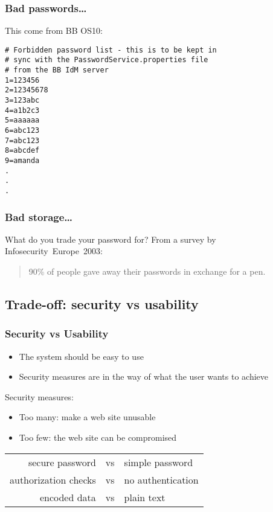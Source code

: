\begin{frame}[fragile]
\frametitle{Bad passwords\ldots}

This come from BB OS10:
\begin{lstlisting}
# Forbidden password list - this is to be kept in 
# sync with the PasswordService.properties file 
# from the BB IdM server
1=123456
2=12345678
3=123abc
4=a1b2c3
5=aaaaaa
6=abc123
7=abc123
8=abcdef
9=amanda
.
.
.
\end{lstlisting}
\end{frame}

\begin{frame}
\frametitle{Bad storage\ldots}

\end{frame}

\begin{frame}
\begin{exampleblock}{What do you trade your password for?}
From a survey by Infosecurity~Europe~2003:
\begin{quote}
90\% of people gave away their passwords in exchange for a pen.
\end{quote}
\end{exampleblock}
\end{frame}

\subsection{Trade-off: security vs usability}

\begin{frame}
\frametitle{Security vs Usability}
\begin{itemize}
\item The system should be easy to use
\item Security measures are in the way of what the user wants to achieve
\end{itemize}
Security measures:
\begin{itemize}
\item Too many: make a web site unusable
\item Too few: the web site can be compromised
\end{itemize}
\begin{example}
\begin{center}
\begin{tabular}{rcl}
secure password & vs & simple password \\
authorization checks & vs & no authentication \\
encoded data & vs & plain text \\
\end{tabular}
\end{center}
\end{example}
\end{frame}

